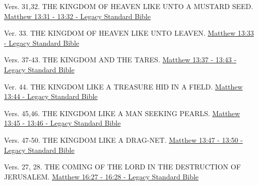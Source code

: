 \documentclass[
  ignorenonframetext,
]{beamer}
\begin{document}
\begin{frame}{13}
\label{section-152}
\begin{block}{Vers. 31,32. THE KINGDOM OF HEAVEN LIKE UNTO A MUSTARD
SEED.}
\label{vers.-3132.-the-kingdom-of-heaven-like-unto-a-mustard-seed.}
\href{https://read.lsbible.org/?q=matt13\%3A31-32}{Matthew 13:31 - 13:32
- Legacy Standard Bible}
\end{block}

\begin{block}{Ver. 33. THE KINGDOM OF HEAVEN LIKE UNTO LEAVEN.}
\label{ver.-33.-the-kingdom-of-heaven-like-unto-leaven.}
\href{https://read.lsbible.org/?q=matt13\%3A33}{Matthew 13:33 - Legacy
Standard Bible}
\end{block}

\begin{block}{Vers. 37-43. THE KINGDOM AND THE TARES.}
\label{vers.-37-43.-the-kingdom-and-the-tares.}
\href{https://read.lsbible.org/?q=matt13\%3A37-43}{Matthew 13:37 - 13:43
- Legacy Standard Bible}
\end{block}

\begin{block}{Ver. 44. THE KINGDOM LIKE A TREASURE HID IN A FIELD.}
\label{ver.-44.-the-kingdom-like-a-treasure-hid-in-a-field.}
\href{https://read.lsbible.org/?q=matt13\%3A44}{Matthew 13:44 - Legacy
Standard Bible}
\end{block}

\begin{block}{Vers. 45,46. THE KINGDOM LIKE A MAN SEEKING PEARLS.}
\label{vers.-4546.-the-kingdom-like-a-man-seeking-pearls.}
\href{https://read.lsbible.org/?q=matt13\%3A45-46}{Matthew 13:45 - 13:46
- Legacy Standard Bible}
\end{block}

\begin{block}{Vers. 47-50. THE KINGDOM LIKE A DRAG-NET.}
\label{vers.-47-50.-the-kingdom-like-a-drag-net.}
\href{https://read.lsbible.org/?q=matt13\%3A47-50}{Matthew 13:47 - 13:50
- Legacy Standard Bible}
\end{block}
\end{frame}

\begin{frame}{16}
\label{section-153}
\begin{block}{Vers. 27, 28. THE COMING OF THE LORD IN THE DESTRUCTION OF
JERUSALEM.}
\label{vers.-27-28.-the-coming-of-the-lord-in-the-destruction-of-jerusalem.}
\href{https://read.lsbible.org/?q=matt16\%3A27-28}{Matthew 16:27 - 16:28
- Legacy Standard Bible}
\end{block}
\end{frame}
\end{document}
